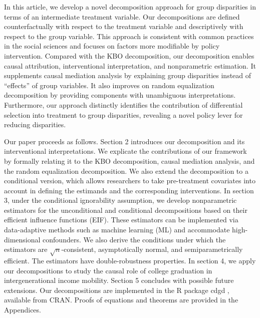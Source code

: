 \documentclass[12pt,a4paper]{article}
\begin{document}
In this article, we develop a novel decomposition approach for group disparities in terms of an intermediate treatment variable. Our decompositions are defined counterfactually with respect to the treatment variable and descriptively with respect to the group variable. This approach is consistent with common practices in the social sciences and focuses on factors more modifiable by policy intervention. Compared with the KBO decomposition, our decomposition enables causal attribution, interventional interpretation, and nonparametric estimation. It supplements causal mediation analysis by explaining group disparities instead of ``effects'' of group variables. It also improves on random equalization decomposition by providing components with unambiguous interpretations. Furthermore, our approach distinctly identifies the contribution of differential selection into treatment to group disparities, revealing a novel policy lever for reducing disparities.

Our paper proceeds as follows. Section 2 introduces our decomposition and its interventional interpretations. We explicate the contributions of our framework by formally relating it to the KBO decomposition, causal mediation analysis, and the random equalization decomposition. We also extend the  decomposition to a conditional version, which allows researchers to take pre-treatment covariates into account in defining the estimands and the corresponding interventions. In section 3, under the conditional ignorability assumption, we develop nonparametric estimators for the unconditional and conditional decompositions based on their efficient influence functions (EIF). These estimators can be implemented via data-adaptive methods such as machine learning (ML) and accommodate high-dimensional confounders. We also derive the conditions under which the estimators are $\sqrt{n}$-consistent, asymptotically normal, and semiparametrically efficient. The estimators have double-robustness properties. In section 4, we apply our decompositions to study the causal role of college graduation in intergenerational income mobility. Section 5 concludes with possible future extensions. Our decompositions are implemented in the R \citep{R_core_team_2023} package cdgd \citep{yu_2023}, available from CRAN. Proofs of equations and theorems are provided in the Appendices.
\end{document}
